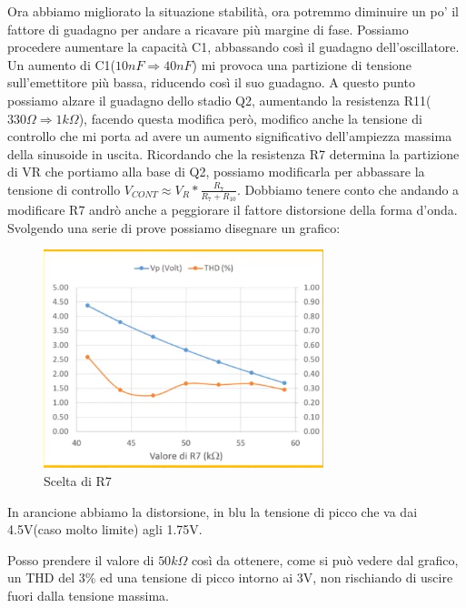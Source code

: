 \documentclass{article}
\begin{document}
Ora abbiamo migliorato la situazione stabilità, ora potremmo diminuire un po' il fattore di guadagno per andare a ricavare più margine di fase.
Possiamo procedere aumentare la capacità C1, abbassando così il guadagno dell'oscillatore.
Un aumento di C1($10nF\Rightarrow 40nF$) mi provoca una partizione di tensione sull'emettitore più bassa, riducendo così il suo guadagno.
A questo punto possiamo alzare il guadagno dello stadio Q2, aumentando la resistenza R11($330\Omega \Rightarrow 1k\Omega$), facendo questa modifica però, modifico anche la tensione di controllo che mi porta ad avere un aumento significativo dell'ampiezza massima della sinusoide in uscita.
Ricordando che la resistenza R7 determina la partizione di VR che portiamo alla base di Q2, possiamo modificarla per abbassare la tensione di controllo $V_{CONT} \approx V_R*\frac{R_7}{R_7+R_10}$.
Dobbiamo tenere conto che andando a modificare R7 andrò anche a peggiorare il fattore distorsione della forma d'onda.
Svolgendo una serie di prove possiamo disegnare un grafico:
~\begin{figure}[H]
\includegraphics[width=\textwidth]{SceltaR7.png}
\centering
\caption{Scelta di R7}
\label{fig:foo}
\end{figure}
In arancione abbiamo la distorsione, in blu la tensione di picco che va dai 4.5V(caso molto limite) agli 1.75V.

Posso prendere il valore di $50k\Omega$ così da ottenere, come si può vedere dal grafico, un THD del 3\% ed una tensione di picco intorno ai 3V, non rischiando di uscire fuori dalla tensione massima. 
\end{document}
